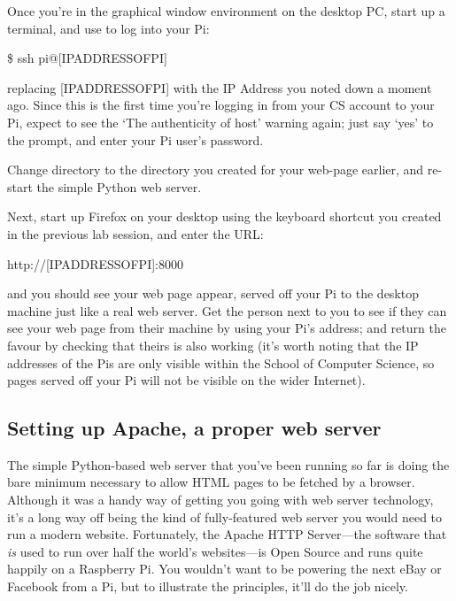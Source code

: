 Once you're in the graphical window environment on the desktop PC, start up a terminal, and use  to log into your Pi:

\begin{ttoutenv}
\$ ssh pi@[IPADDRESSOFPI]
\end{ttoutenv}

replacing [IPADDRESSOFPI] with the IP Address you noted down a moment ago. Since this is the first time you're logging in from your CS account to your Pi, expect to see the `The authenticity of host' warning again; just say `yes' to the prompt, and enter your Pi user's password. 

Change directory to the  directory you created for your web-page earlier, and re-start the simple Python web server. 

Next, start up Firefox on your desktop using the keyboard shortcut you created in the previous lab session, and enter the URL:

\begin{ttoutenv}
http://[IPADDRESSOFPI]:8000
\end{ttoutenv}

and you should see your web page appear, served off your Pi to the desktop machine just like a real web server. Get the person next to you to see if they can see your web page from their machine by using your Pi's address; and return the favour by checking that theirs is also working (it's worth noting that the IP addresses of the Pis are only visible within the School of Computer Science, so pages served off your Pi will not be visible on the wider Internet).


\subsection{Setting up Apache, a proper web server}

The simple Python-based web server that you've been running so far is doing the bare minimum necessary to allow HTML pages to be fetched by a browser. Although it was a handy way of getting you going with web server technology, it's a long way off being the kind of fully-featured web server you would need to run a modern website. Fortunately, the Apache HTTP Server---the software that \textit{is} used to run over half the world's websites---is Open Source and runs quite happily on a Raspberry Pi. You wouldn't want to be powering the next eBay or Facebook from a Pi, but to illustrate the principles, it'll do the job nicely. 

